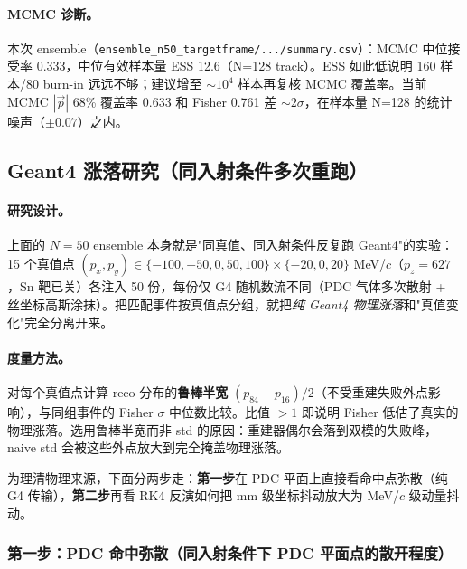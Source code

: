 \documentclass[a4paper, 11pt]{article}
\begin{document}
\paragraph{MCMC 诊断。}
本次 ensemble（\texttt{ensemble\_n50\_targetframe/.../summary.csv}）：MCMC 中位接受率 0.333，中位有效样本量 ESS 12.6（N=128 track）。ESS 如此低说明 160 样本/80 burn-in 远远不够；建议增至 $\sim\!10^4$ 样本再复核 MCMC 覆盖率。当前 MCMC $|\vec p|$ 68\% 覆盖率 0.633 和 Fisher 0.761 差 $\sim\!2\sigma$，在样本量 N=128 的统计噪声（$\pm 0.07$）之内。

\subsection{Geant4 涨落研究（同入射条件多次重跑）}

\paragraph{研究设计。}
上面的 $N{=}50$ ensemble 本身就是"同真值、同入射条件反复跑 Geant4"的实验：15 个真值点 $(p_x, p_y) \in \{-100,-50,0,50,100\}{\times}\{-20,0,20\}$ MeV/$c$（$p_z=627$，Sn 靶已关）各注入 50 份，每份仅 G4 随机数流不同（PDC 气体多次散射 + 丝坐标高斯涂抹）。把匹配事件按真值点分组，就把\emph{纯 Geant4 物理涨落}和"真值变化"完全分离开来。

\paragraph{度量方法。}
对每个真值点计算 reco 分布的\textbf{鲁棒半宽} $(p_{84}-p_{16})/2$（不受重建失败外点影响），与同组事件的 Fisher $\sigma$ 中位数比较。比值 $> 1$ 即说明 Fisher 低估了真实的物理涨落。选用鲁棒半宽而非 std 的原因：重建器偶尔会落到双模的失败峰，naive std 会被这些外点放大到完全掩盖物理涨落。

为理清物理来源，下面分两步走：\textbf{第一步}在 PDC 平面上直接看命中点弥散（纯 G4 传输），\textbf{第二步}再看 RK4 反演如何把 mm 级坐标抖动放大为 MeV/$c$ 级动量抖动。

\subsubsection{第一步：PDC 命中弥散（同入射条件下 PDC 平面点的散开程度）}
\end{document}
